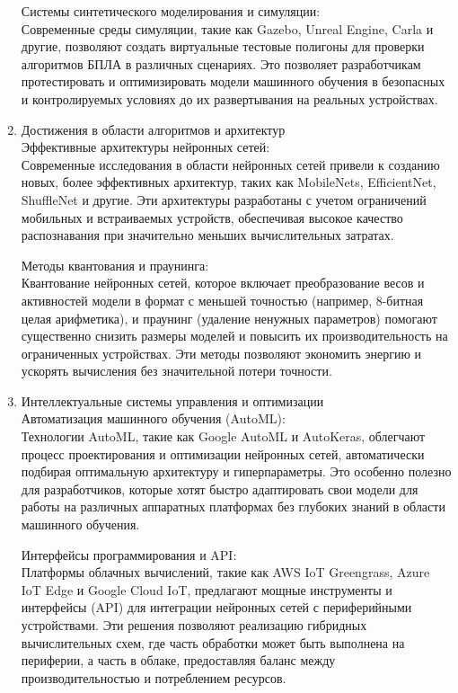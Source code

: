 \begin{enumerate}
        Системы синтетического моделирования и симуляции: \\
        Современные среды симуляции, такие как Gazebo, Unreal Engine, Carla и другие, позволяют создать виртуальные тестовые полигоны для проверки алгоритмов БПЛА в различных сценариях. Это позволяет разработчикам протестировать и оптимизировать модели машинного обучения в безопасных и контролируемых условиях до их развертывания на реальных устройствах.
        \item Достижения в области алгоритмов и архитектур \\
        Эффективные архитектуры нейронных сетей: \\
        Современные исследования в области нейронных сетей привели к созданию новых, более эффективных архитектур, таких как MobileNets, EfficientNet, ShuffleNet и другие. Эти архитектуры разработаны с учетом ограничений мобильных и встраиваемых устройств, обеспечивая высокое качество распознавания при значительно меньших вычислительных затратах.
        
        Методы квантования и праунинга: \\
        Квантование нейронных сетей, которое включает преобразование весов и активностей модели в формат с меньшей точностью (например, 8-битная целая арифметика), и праунинг (удаление ненужных параметров) помогают существенно снизить размеры моделей и повысить их производительность на ограниченных устройствах. Эти методы позволяют экономить энергию и ускорять вычисления без значительной потери точности.
        \item Интеллектуальные системы управления и оптимизации \\
        Автоматизация машинного обучения (AutoML): \\
        Технологии AutoML, такие как Google AutoML и AutoKeras, облегчают процесс проектирования и оптимизации нейронных сетей, автоматически подбирая оптимальную архитектуру и гиперпараметры. Это особенно полезно для разработчиков, которые хотят быстро адаптировать свои модели для работы на различных аппаратных платформах без глубоких знаний в области машинного обучения.
        
        Интерфейсы программирования и API: \\
        Платформы облачных вычислений, такие как AWS IoT Greengrass, Azure IoT Edge и Google Cloud IoT, предлагают мощные инструменты и интерфейсы (API) для интеграции нейронных сетей с периферийными устройствами. Эти решения позволяют реализацию гибридных вычислительных схем, где часть обработки может быть выполнена на периферии, а часть в облаке, предоставляя баланс между производительностью и потреблением ресурсов.
    \end{enumerate}

